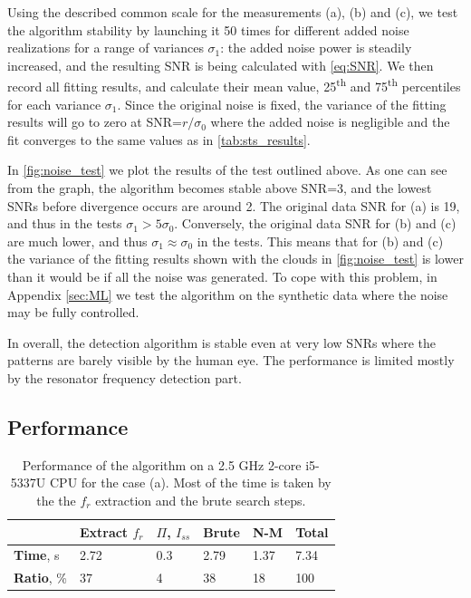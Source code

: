 \documentclass[%
 aip,
 draft,
 amsmath,amssymb,
 reprint,%
]{revtex4-1}
\begin{document}
Using the described common scale for the measurements (a), (b) and (c), we test the algorithm stability by launching it 50 times for different added noise realizations for a range of variances $\sigma_1$: the added noise power is steadily increased, and the resulting SNR is being calculated with \eqref{eq:SNR}. We then record all fitting results, and calculate their mean value, 25\textsuperscript{th} and 75\textsuperscript{th} percentiles for each variance $\sigma_1$.  Since the original noise is fixed, the variance of the fitting results will go to zero at SNR=$ r/\sigma_0 $ where the added noise is negligible and the fit converges to the same values as in \autoref{tab:sts_results}. 

In \autoref{fig:noise_test} we plot the results of the test outlined above. As one can see from the graph, the algorithm becomes stable above SNR=3, and the lowest SNRs before divergence occurs are around 2. The original data SNR for (a) is 19, and thus in the tests $\sigma_1 > 5\sigma_0$. Conversely, the original data SNR for (b) and (c) are much lower, and thus $\sigma_1 \approx \sigma_0$ in the tests. This means that for (b) and (c) the variance of the fitting results shown with the clouds in \autoref{fig:noise_test} is lower than it would be if all the noise was generated. To cope with this problem, in Appendix \ref{sec:ML} we test the algorithm on the synthetic data where the noise may be fully controlled.

In overall, the detection algorithm is stable even at very low SNRs where the patterns are barely visible by the human eye. The performance is limited mostly by the resonator frequency detection part.


\subsection{Performance}


\begin{table}[b]
	\begin{ruledtabular}
		\begin{tabular}{llllll}
			&Extract $f_r$& $\Pi$, $I_{ss}$ & Brute &N-M &
			\textbf{Total}\\\hline
			\textbf{Time}, s& 2.72& 0.3&2.79&1.37&7.34\\
			\textbf{Ratio}, \% & 37 &4 &38 &18 &100
		\end{tabular}
	\end{ruledtabular}
	\caption{Performance of the algorithm on a 2.5 GHz 2-core i5-5337U CPU for the case (a). Most of the time is taken by the the $f_r$ extraction and the brute search steps.}
	\label{tab:performance}
\end{table}
\end{document}
